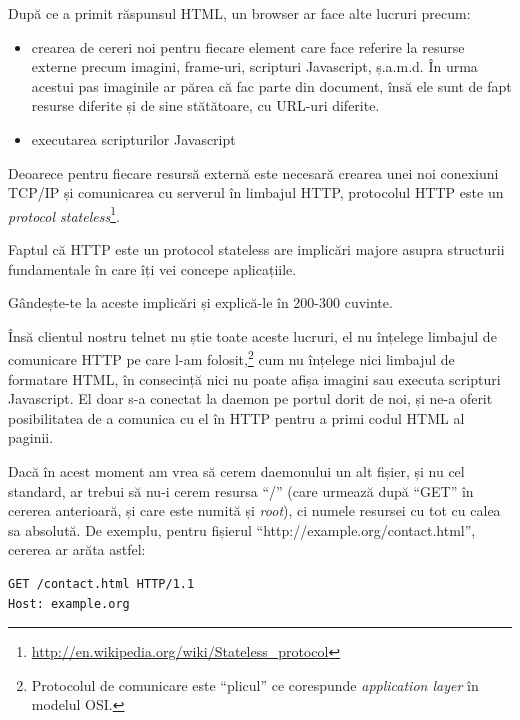 După ce a primit răspunsul HTML, un browser ar face alte lucruri precum:
\begin{itemize}
\item crearea de cereri noi pentru fiecare element care face referire la resurse
externe precum imagini, frame-uri, scripturi Javascript, ș.a.m.d. În urma 
acestui pas imaginile ar părea că fac parte din document, însă ele sunt de fapt
resurse diferite și de sine stătătoare, cu URL-uri diferite.
\item executarea scripturilor Javascript
\end{itemize}

Deoarece pentru fiecare resursă externă este necesară crearea unei noi conexiuni
TCP/IP și comunicarea cu serverul în limbajul HTTP, protocolul HTTP este
un \textsl{protocol stateless}\footnote{\url{http://en.wikipedia.org/wiki/Stateless\_protocol}}.


\begin{Exercise}[title={HTTP e stateless}]
Faptul că HTTP este un protocol stateless are implicări majore asupra
structurii fundamentale în care îți vei concepe aplicațiile.

Gândește-te la aceste implicări și explică-le în 200-300 cuvinte.
\end{Exercise}

Însă clientul nostru telnet nu știe toate aceste lucruri, el nu înțelege
limbajul de comunicare HTTP pe care l-am folosit,\footnote{Protocolul
de comunicare este ``plicul'' ce corespunde \textsl{application layer} în modelul OSI.}
cum nu înțelege nici limbajul
de formatare HTML, în consecință nici nu poate afișa imagini sau executa scripturi Javascript.
El doar s-a conectat la daemon pe portul dorit de noi, și ne-a oferit posibilitatea
de a comunica cu el în HTTP pentru a primi codul HTML al paginii.

Dacă în acest moment am vrea să cerem daemonului un alt fișier, și nu cel standard,
ar trebui să nu-i cerem resursa ``/'' (care urmează după ``GET'' în cererea anterioară,
și care este numită și \textsl{root}),
ci numele resursei cu tot cu calea sa absolută. De exemplu, pentru fișierul
``http://example.org/contact.html'',
cererea ar arăta astfel:

\begin{verbatim}
GET /contact.html HTTP/1.1
Host: example.org

\end{verbatim}


